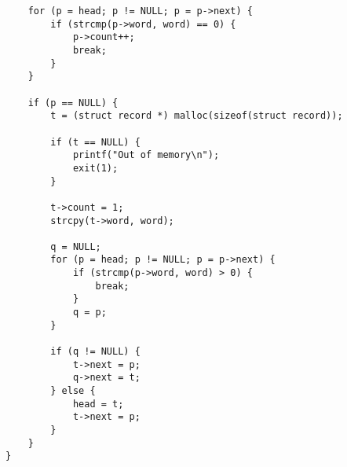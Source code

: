 \documentclass[11pt,a4paper,a4j]{jsarticle}
\begin{document}
\begin{verbatim}
    for (p = head; p != NULL; p = p->next) {
        if (strcmp(p->word, word) == 0) {
            p->count++;
            break;
        }
    }

    if (p == NULL) {
        t = (struct record *) malloc(sizeof(struct record));

        if (t == NULL) {
            printf("Out of memory\n");
            exit(1);
        }

        t->count = 1;
        strcpy(t->word, word);
    
        q = NULL;
        for (p = head; p != NULL; p = p->next) {
            if (strcmp(p->word, word) > 0) {
                break;
            }
            q = p;
        }

        if (q != NULL) { 
            t->next = p;            
            q->next = t;
        } else {
            head = t;
            t->next = p;
        }
    }
}
\end{verbatim}
\end{document}
